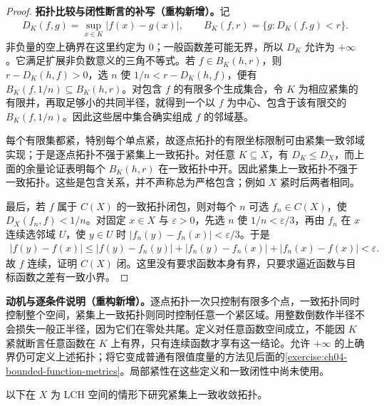 \documentclass[../../main.tex]{subfiles}%
\begin{document}
\begin{proof}
\textbf{拓扑比较与闭性断言的补写（重构新增）。}记
\begin{align*}
D_K(f,g)=\sup_{x\in K}|f(x)-g(x)|,\qquad
B_K(f,r)=\{g:D_K(f,g)<r\}.
\end{align*}
非负量的空上确界在这里约定为 $0$；一般函数差可能无界，所以 $D_K$ 允许为 $+\infty$。它满足扩展非负数意义的三角不等式。若 $f\in B_K(h,r)$，则 $r-D_K(h,f)>0$，选 $n$ 使 $1/n<r-D_K(h,f)$，便有 $B_K(f,1/n)\subseteq B_K(h,r)$。对包含 $f$ 的有限多个生成集合，令 $K$ 为相应紧集的有限并，再取足够小的共同半径，就得到一个以 $f$ 为中心、包含于该有限交的 $B_K(f,1/n)$。因此这些居中集合确实组成 $f$ 的邻域基。

每个有限集都紧，特别每个单点紧，故逐点拓扑的有限坐标限制可由紧集一致邻域实现；于是逐点拓扑不强于紧集上一致拓扑。对任意 $K\subseteq X$，有 $D_K\le D_X$，而上面的余量论证表明每个 $B_K(h,r)$ 在一致拓扑中开。因此紧集上一致拓扑不强于一致拓扑。这些是包含关系，并不声称总为严格包含；例如 $X$ 紧时后两者相同。

最后，若 $f$ 属于 $C(X)$ 的一致拓扑闭包，则对每个 $n$ 可选 $f_n\in C(X)$，使 $D_X(f_n,f)<1/n$。对固定 $x\in X$ 与 $\varepsilon>0$，先选 $n$ 使 $1/n<\varepsilon/3$，再由 $f_n$ 在 $x$ 连续选邻域 $U$，使 $y\in U$ 时 $|f_n(y)-f_n(x)|<\varepsilon/3$。于是
\begin{align*}
|f(y)-f(x)|
\le |f(y)-f_n(y)|+|f_n(y)-f_n(x)|+|f_n(x)-f(x)|<\varepsilon.
\end{align*}
故 $f$ 连续，证明 $C(X)$ 闭。这里没有要求函数本身有界，只要求逼近函数与目标函数之差有一致小界。
\end{proof}
\begin{remark}
\textbf{动机与逐条件说明（重构新增）。}逐点拓扑一次只控制有限多个点，一致拓扑同时控制整个空间，紧集上一致拓扑则同时控制任意一个紧区域。用整数倒数作半径不会损失一般正半径，因为它们在零处共尾。定义对任意函数空间成立，不能因 $K$ 紧就断言任意函数在 $K$ 上有界，只有连续函数才享有这一结论。允许 $+\infty$ 的上确界仍可定义上述拓扑；将它变成普通有限值度量的方法见后面的\cref{exercise:ch04-bounded-function-metrics}。局部紧性在这些定义和一致闭性中尚未使用。
\end{remark}
以下在 $X$ 为 LCH 空间的情形下研究紧集上一致收敛拓扑。
\end{document}
